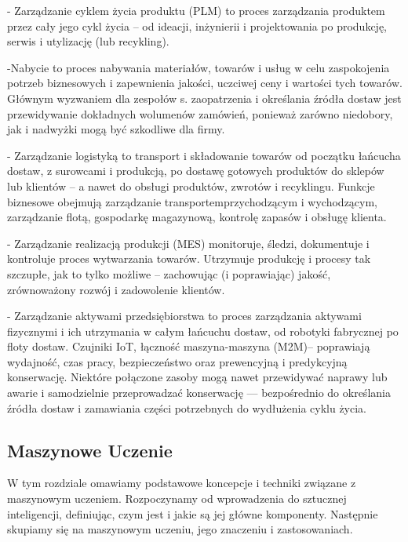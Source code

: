    - Zarządzanie cyklem życia produktu (PLM) to proces zarządzania produktem przez cały jego cykl życia – od ideacji, inżynierii i projektowania po produkcję, serwis i utylizację (lub recykling).

    -Nabycie to proces nabywania materiałów, towarów i usług w celu zaspokojenia potrzeb biznesowych i zapewnienia jakości, uczciwej ceny i wartości tych towarów. Głównym wyzwaniem dla zespołów s. zaopatrzenia i określania źródła dostaw jest przewidywanie dokładnych wolumenów zamówień, ponieważ zarówno niedobory, jak i nadwyżki mogą być szkodliwe dla firmy. 

   - Zarządzanie logistyką to transport i składowanie towarów od początku łańcucha dostaw, z surowcami i produkcją, po dostawę gotowych produktów do sklepów lub klientów – a nawet do obsługi produktów, zwrotów i recyklingu. Funkcje biznesowe obejmują zarządzanie transportemprzychodzącym i wychodzącym, zarządzanie flotą, gospodarkę magazynową, kontrolę zapasów i obsługę klienta. 

   - Zarządzanie realizacją produkcji (MES) monitoruje, śledzi, dokumentuje i kontroluje proces wytwarzania towarów. Utrzymuje produkcję i procesy tak szczupłe, jak to tylko możliwe – zachowując (i poprawiając) jakość, zrównoważony rozwój i zadowolenie klientów. 

   - Zarządzanie aktywami przedsiębiorstwa to proces zarządzania aktywami fizycznymi i ich utrzymania w całym łańcuchu dostaw, od robotyki fabrycznej po floty dostaw. Czujniki IoT, łączność maszyna-maszyna (M2M)– poprawiają wydajność, czas pracy, bezpieczeństwo oraz prewencyjną i predykcyjną konserwację. Niektóre połączone zasoby mogą nawet przewidywać naprawy lub awarie i samodzielnie przeprowadzać konserwację — bezpośrednio do określania źródła dostaw i zamawiania części potrzebnych do wydłużenia cyklu życia.\cite{scm2023}






\subsection{Maszynowe Uczenie}

W tym rozdziale omawiamy podstawowe koncepcje i techniki związane z maszynowym uczeniem. Rozpoczynamy od wprowadzenia do sztucznej inteligencji, definiując, czym jest i jakie są jej główne komponenty. Następnie skupiamy się na maszynowym uczeniu, jego znaczeniu i zastosowaniach.


\vspace{\baselineskip}

